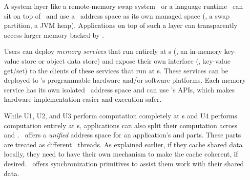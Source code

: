 A system layer like a remote-memory swap system~\cite{InfiniSwap,FastSwap} or a language runtime~\cite{Semeru}
can sit on top of \sys\ and use a \sys\ address space as its own managed space (\eg, a swap partition, a JVM heap).
Applications on top of such a layer can transparently access larger memory backed by \sys.


Users can deploy {\em memory services} that run entirely at \MN{}s (\eg, 
an in-memory key-value store or object data store) 
and expose their own interface (\eg, key-value get/set) 
to the clients of these services that run at \CN{}s.
These services can be deployed to \sysboard's programmable hardware and/or software platforms.
Each memory service has its own isolated \sys\ address space and can use \sys's APIs, 
which makes hardware implementation easier and execution safer.

While U1, U2, and U3 perform computation completely at \CN{}s and U4 performs computation entirely at \MN{}s,
applications can also split their computation across \CN{} and \MN{}.
\sys\ offers a {\em unified} address space for an application's \CN{} and \MN{} parts.
These parts are treated as different \sys\ threads. 
As explained earlier, if they cache shared data locally, they need to have their own mechanism to make the cache coherent, if desired.
\sys\ offers synchronization primitives to assist them work with their shared data.

\fi
